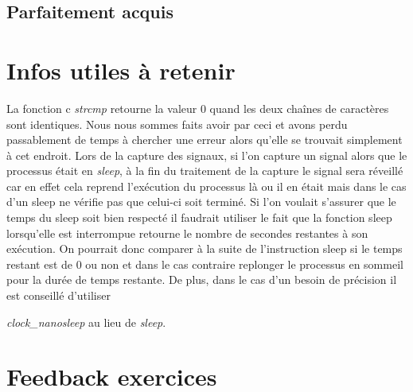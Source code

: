 \documentclass{ReportTemplate}
\begin{document}
\subsection{Parfaitement acquis}

\section{Infos utiles à retenir}
La fonction c \textit{strcmp} retourne la valeur 0 quand les deux chaînes de
caractères sont identiques. Nous nous sommes faits avoir par ceci et avons perdu
passablement de temps à chercher une erreur alors qu'elle se trouvait simplement
à cet endroit.\newline
Lors de la capture des signaux, si l'on capture un signal alors que le processus
était en \textit{sleep}, à la fin du traitement de la capture le signal sera
réveillé car en effet cela reprend l'exécution du processus là ou il en était
mais dans le cas d'un sleep ne vérifie pas que celui-ci soit terminé. Si l'on
voulait s'assurer que le temps du sleep soit bien respecté il faudrait utiliser
le fait que la fonction sleep lorsqu'elle est interrompue retourne le nombre de
secondes restantes à son exécution. On pourrait donc comparer à la suite de
l'instruction sleep si le temps restant est de 0 ou non et dans le cas contraire
replonger le processus en sommeil pour la durée de temps restante. De plus, dans
le cas d'un besoin de précision il est conseillé d'utiliser

\textit{clock\_nanosleep} au lieu de \textit{sleep}.

\section{Feedback exercices}
\end{document}
